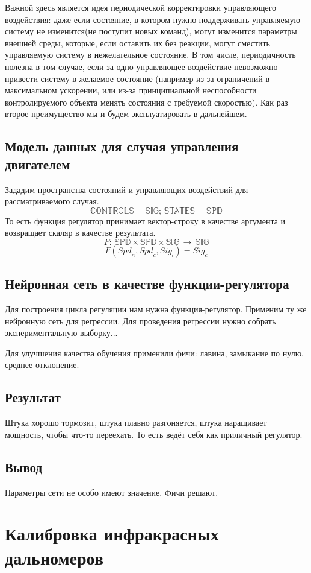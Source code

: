 \documentclass[14pt]{extreport}
\begin{document}
            Важной здесь является идея периодической корректировки управляющего воздействия: даже если состояние, в котором нужно поддерживать управляемую систему не изменится(не поступит новых команд), могут изменится параметры внешней среды, которые, если оставить их без реакции, могут сместить управляемую систему в нежелательное состояние. В том числе, периодичность полезна в том случае, если за одно управляющее воздействие невозможно привести систему в желаемое состояние (например из-за ограничений в максимальном ускорении, или из-за принципиальной неспособности контролируемого объекта менять состояния с требуемой скоростью). Как раз второе преимущество мы и будем эксплуатировать в дальнейшем.
        \section{Модель данных для случая управления двигателем}
            Зададим пространства состояний и управляющих воздействий для рассматриваемого случая.
            \[\mathbb{CONTROLS} = \mathbb{SIG};\, \mathbb{STATES} = \mathbb{SPD}\]
            То есть функция регулятор принимает вектор-строку в качестве аргумента и возвращает скаляр в качестве результата.
            \[F:\,\mathbb{SPD}\times\mathbb{SPD}\times\mathbb{SIG}\,\rightarrow\,\mathbb{SIG}\]
            \[F({Spd}_n,{Spd}_c,{Sig}_l) = {Sig}_c\]
        \section{Нейронная сеть в качестве функции-регулятора}
            Для построения цикла регуляции нам нужна функция-регулятор. Применим ту же нейронную сеть для регрессии. Для проведения регрессии нужно собрать экспериментальную выборку...
            
            Для улучшения качества обучения применили фичи: лавина, замыкание по нулю, среднее отклонение.
        \section{Результат}
            Штука хорошо тормозит, штука плавно разгоняется, штука наращивает мощность, чтобы что-то переехать. То есть ведёт себя как приличный регулятор.
        \section{Вывод}
            Параметры сети не особо имеют значение. Фичи решают.
    \chapter{Калибровка инфракрасных дальномеров}
\end{document}
